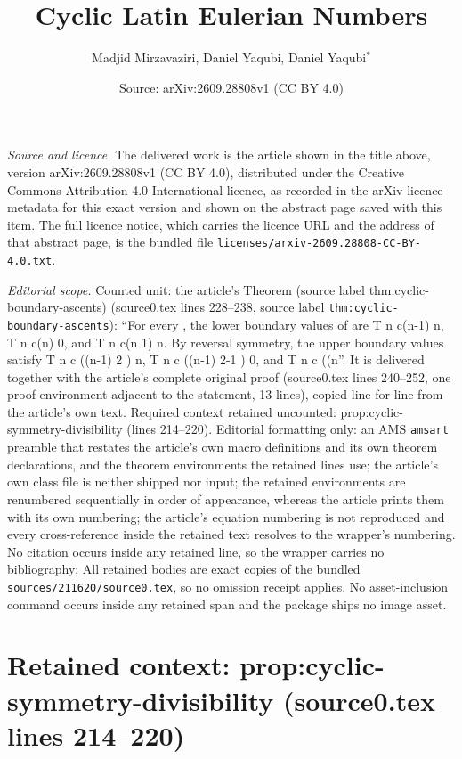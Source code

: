 \documentclass[10pt,a4paper]{amsart}
\title[Cyclic Latin Eulerian Numbers]{Cyclic Latin Eulerian Numbers}
\author{Madjid Mirzavaziri, Daniel Yaqubi, Daniel Yaqubi$^{*}$}
\date{Source: arXiv:2609.28808v1 (CC BY 4.0)}
\theoremstyle{plain}
\begin{document}
\maketitle

\noindent\emph{Source and licence.} The delivered work is the article shown in the title above, version arXiv:2609.28808v1 (CC BY 4.0), distributed under the Creative Commons Attribution 4.0 International licence, as recorded in the arXiv licence metadata for this exact version and shown on the abstract page saved with this item. The full licence notice, which carries the licence URL and the address of that abstract page, is the bundled file \texttt{licenses/arxiv-2609.28808-CC-BY-4.0.txt}.
\par\smallskip

\noindent\textit{Editorial scope.} Counted unit: the article's Theorem (source label thm:cyclic-boundary-ascents) (source0.tex lines 228--238, source label \texttt{thm:cyclic-boundary-ascents}): ``For every , the lower boundary values of are T n c(n-1) n, T n c(n) 0, and T n c(n 1) n. By reversal symmetry, the upper boundary values satisfy T n c ((n-1) 2 ) n, T n c ((n-1) 2-1 ) 0, and T n c ((n''. It is delivered together with the article's complete original proof (source0.tex lines 240--252, one proof environment adjacent to the statement, 13 lines), copied line for line from the article's own text. Required context retained uncounted: prop:cyclic-symmetry-divisibility (lines 214--220). Editorial formatting only: an AMS \texttt{amsart} preamble that restates the article's own macro definitions and its own theorem declarations, and the theorem environments the retained lines use; the article's own class file is neither shipped nor input; the retained environments are renumbered sequentially in order of appearance, whereas the article prints them with its own numbering; the article's equation numbering is not reproduced and every cross-reference inside the retained text resolves to the wrapper's numbering. No citation occurs inside any retained line, so the wrapper carries no bibliography; All retained bodies are exact copies of the bundled \texttt{sources/211620/source0.tex}, so no omission receipt applies. No asset-inclusion command occurs inside any retained span and the package ships no image asset.


\section*{Retained context: prop:cyclic-symmetry-divisibility (source0.tex lines 214--220)}
\end{document}
